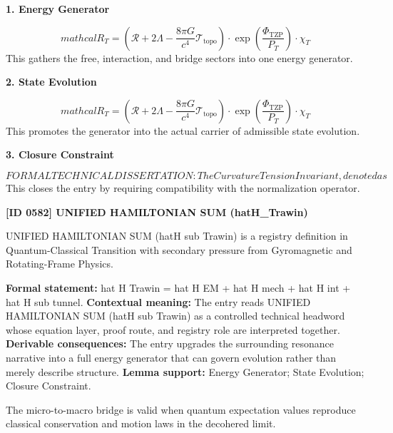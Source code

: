 \noindent\textbf{1. Energy Generator}\par
\[
mathcal{R}_T = \left( \mathcal{R} + 2\Lambda - \frac{8\pi G}{c^4} \mathcal{T}_{\text{topo}} \right) \cdot \exp\left( \frac{\Phi_{\text{TZP}}}{P_T} \right) \cdot \chi_T
\]
\noindent This gathers the free, interaction, and bridge sectors into one energy generator.\par
\noindent\textbf{2. State Evolution}\par
\[
mathcal{R}_T = \left( \mathcal{R} + 2\Lambda - \frac{8\pi G}{c^4} \mathcal{T}_{\text{topo}} \right) \cdot \exp\left( \frac{\Phi_{\text{TZP}}}{P_T} \right) \cdot \chi_T
\]
\noindent This promotes the generator into the actual carrier of admissible state evolution.\par
\noindent\textbf{3. Closure Constraint}\par
\[
FORMAL TECHNICAL DISSERTATION:The Curvature Tension Invariant, denoted as
\]
\noindent This closes the entry by requiring compatibility with the normalization operator.\par

\clearpage
\noindent\textbf{[ID 0582] UNIFIED HAMILTONIAN SUM (hatH\_Trawin)}\par
\vspace{0.35em}
\begingroup\small
{}
UNIFIED HAMILTONIAN SUM (hatH sub Trawin) is a registry definition in Quantum-Classical Transition with secondary pressure from Gyromagnetic and Rotating-Frame Physics.

\begingroup\footnotesize\setlength{\emergencystretch}{3em}\sloppy
\textbf{Formal statement:} hat H Trawin = hat H EM + hat H mech + hat H int + hat H sub tunnel. \textbf{Contextual meaning:} The entry reads UNIFIED HAMILTONIAN SUM (hatH sub Trawin) as a controlled technical headword whose equation layer, proof route, and registry role are interpreted together. \textbf{Derivable consequences:} The entry upgrades the surrounding resonance narrative into a full energy generator that can govern evolution rather than merely describe structure. \textbf{Lemma support:} Energy Generator; State Evolution; Closure Constraint.\par
\endgroup

The micro-to-macro bridge is valid when quantum expectation values reproduce classical conservation and motion laws in the decohered limit.

